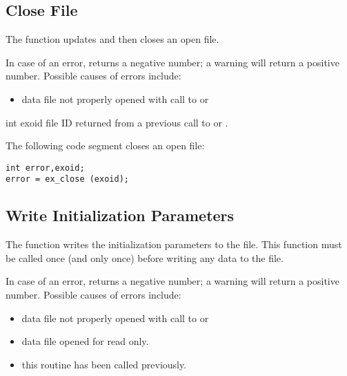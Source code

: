 \subsection{Close \exo{} File}

The function  updates and
then closes an open \exo{} file.

In case of an error,  returns a negative number; a
warning will return a positive number. Possible causes of errors
include:
\begin{itemize}
 \item data file not properly opened with call to  or
\end{itemize}



\begin{parameters}
\item[{int exoid \R{}}]
\exo{} file ID returned from a previous call to  
or .
\end{parameters}

The following code segment closes an open \exo{} file:

\begin{lstlisting}
int error,exoid;
error = ex_close (exoid);
\end{lstlisting}



\subsection{Write Initialization Parameters}

The function  writes the
initialization parameters to the \exo{}
file. This function must be called once (and only once) before
writing any data to the file.


In case of an error,  returns a negative number;
a warning will return a positive number.  Possible causes of errors
include:

\begin{itemize}
 \item data file not properly opened with call to  or

 \item data file opened for read only.

 \item this routine has been called previously.
\end{itemize}


